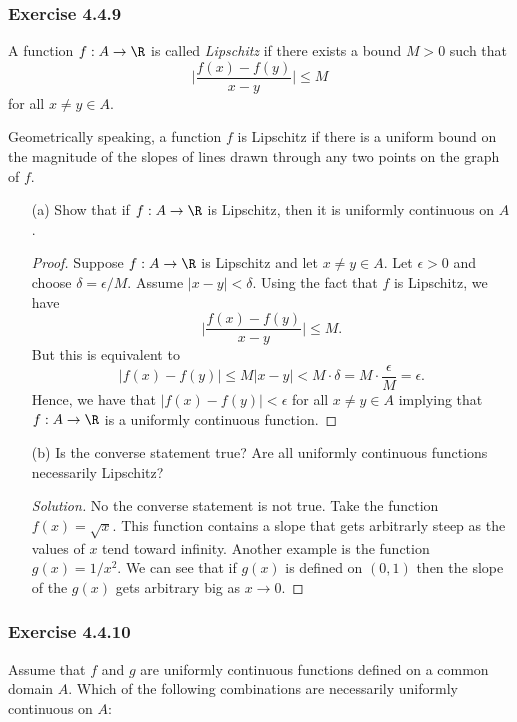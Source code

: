 \subsubsection{Exercise 4.4.9}
\begin{tcolorbox}
    \begin{defn}
        A function \( f: A \to \R  \) is called \textit{Lipschitz} if there exists a bound \( M > 0  \) such that 
        \[ \Big| \frac{ f(x) - f(y) }{ x - y  }   \Big| \leq M  \]
        for all \( x \neq y \in A  \).
    \end{defn}
\end{tcolorbox}
Geometrically speaking, a function \( f \) is Lipschitz if there is a uniform bound on the magnitude of the slopes of lines drawn through any two points on the graph of \( f \).

\begin{enumerate}
    \item[(a)] Show that if \( f: A \to \R  \) is Lipschitz, then it is uniformly continuous on \( A  \).
        \begin{proof}
        Suppose \( f: A \to \R  \) is Lipschitz and let \( x \neq y \in A  \). Let \( \epsilon > 0  \) and choose \( \delta = \epsilon / M  \). Assume \( | x - y  | < \delta  \). Using the fact that \( f  \) is Lipschitz, we have 
        \[ \Big| \frac{ f(x) - f(y)  }{ x - y  }   \Big| \leq M . \]
        But this is equivalent to 
        \[ | f(x) - f(y)  | \leq M | x - y  | < M \cdot \delta = M \cdot \frac{ \epsilon  }{ M  }  = \epsilon. \]
        Hence, we have that \( | f(x) - f(y) | < \epsilon  \) for all \( x \neq y \in A  \) implying that \( f: A \to \R   \) is a uniformly continuous function.
        \end{proof}
    \item[(b)] Is the converse statement true? Are all uniformly continuous functions necessarily Lipschitz?
        \begin{proof}[Solution]
        No the converse statement is not true. Take the function \( f(x) = \sqrt{ x  }  \). This function contains a slope that gets arbitrarly steep as the values of \( x  \) tend toward infinity. Another example is the function \( g(x) = 1 / x^2  \). We can see that if \( g(x)  \) is defined on \( (0,1 ) \) then the slope of the \( g(x)  \) gets arbitrary big as \( x \to 0  \).
        \end{proof}
\end{enumerate}

\subsubsection{Exercise 4.4.10} Assume that \( f \) and \( g  \) are uniformly continuous functions defined on a common domain \( A  \). Which of the following combinations are necessarily uniformly continuous on \( A  \):

